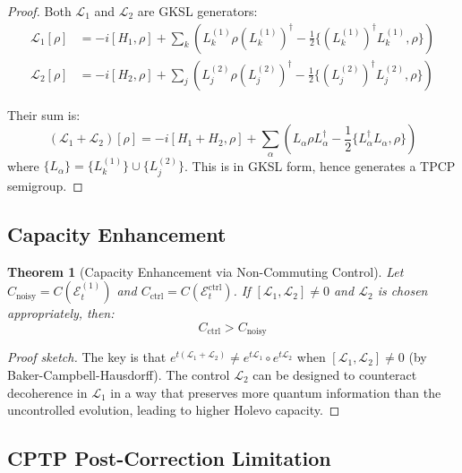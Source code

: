 \documentclass[12pt,a4paper]{article}
\newtheorem{theorem}{Theorem}[section]
\begin{document}
\begin{proof}
Both $\mathcal{L}_1$ and $\mathcal{L}_2$ are GKSL generators:
\begin{align}
\mathcal{L}_1[\rho] &= -i[H_1, \rho] + \sum_k \left(L_k^{(1)} \rho (L_k^{(1)})^\dagger - \frac{1}{2}\{(L_k^{(1)})^\dagger L_k^{(1)}, \rho\}\right) \\
\mathcal{L}_2[\rho] &= -i[H_2, \rho] + \sum_j \left(L_j^{(2)} \rho (L_j^{(2)})^\dagger - \frac{1}{2}\{(L_j^{(2)})^\dagger L_j^{(2)}, \rho\}\right)
\end{align}

Their sum is:
\begin{equation}
(\mathcal{L}_1 + \mathcal{L}_2)[\rho] = -i[H_1 + H_2, \rho] + \sum_{\alpha} \left(L_\alpha \rho L_\alpha^\dagger - \frac{1}{2}\{L_\alpha^\dagger L_\alpha, \rho\}\right)
\end{equation}
where $\{L_\alpha\} = \{L_k^{(1)}\} \cup \{L_j^{(2)}\}$. This is in GKSL form, hence generates a TPCP semigroup.
\end{proof}

\subsection{Capacity Enhancement}

\begin{theorem}[Capacity Enhancement via Non-Commuting Control]
\label{thm:capacity_enhancement}
Let $C_{\text{noisy}} = C(\mathcal{E}_t^{(1)})$ and $C_{\text{ctrl}} = C(\mathcal{E}_t^{\text{ctrl}})$. If $[\mathcal{L}_1, \mathcal{L}_2] \neq 0$ and $\mathcal{L}_2$ is chosen appropriately, then:
\begin{equation}
C_{\text{ctrl}} > C_{\text{noisy}}
\end{equation}
\end{theorem}

\begin{proof}[Proof sketch]
The key is that $e^{t(\mathcal{L}_1 + \mathcal{L}_2)} \neq e^{t\mathcal{L}_1} \circ e^{t\mathcal{L}_2}$ when $[\mathcal{L}_1, \mathcal{L}_2] \neq 0$ (by Baker-Campbell-Hausdorff). The control $\mathcal{L}_2$ can be designed to counteract decoherence in $\mathcal{L}_1$ in a way that preserves more quantum information than the uncontrolled evolution, leading to higher Holevo capacity.
\end{proof}

\subsection{CPTP Post-Correction Limitation}
\end{document}
